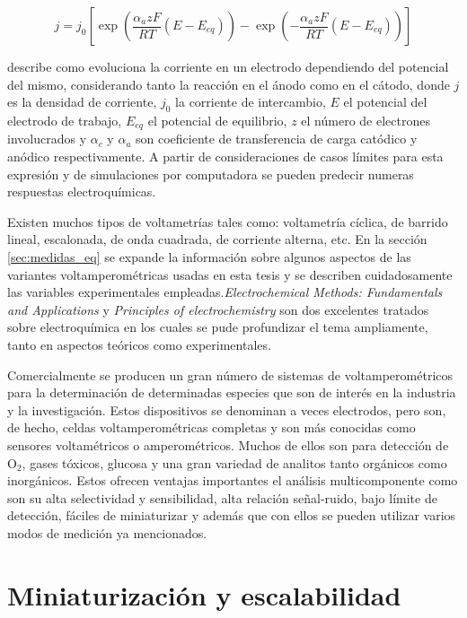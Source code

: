 			\begin{equation}
			j=j_0\left[\exp\left(\frac{\alpha_azF}{RT}(E-E_{eq})\right)-\exp\left(-\frac{\alpha_azF}{RT}(E-E_{eq})\right)\right]
			\label{eq:butler}
			\end{equation}


		\noindent describe como evoluciona la corriente en un electrodo dependiendo del potencial del mismo, considerando tanto la reacción en el ánodo como en el cátodo, donde $j$ es la densidad de corriente, $j_0$ la corriente de intercambio, $E$ el potencial del electrodo de trabajo, $E_{eq}$ el potencial de equilibrio, $z$ el número de electrones involucrados y $\alpha_c$ y $\alpha_a$ son coeficiente de transferencia de carga catódico y anódico respectivamente. A partir de consideraciones de casos límites para esta expresión y de simulaciones por computadora se pueden predecir numeras respuestas electroquímicas.

		Existen muchos tipos de voltametrías tales como: voltametría cíclica, de barrido lineal, escalonada, de onda cuadrada, de corriente alterna, etc. En la sección \ref{sec:medidas_eq} se expande la información sobre algunos aspectos de las variantes voltamperométricas usadas en esta tesis y se describen cuidadosamente las variables experimentales empleadas.\textit{Electrochemical Methods: Fundamentals and Applications}\cite{Wi2000} y  \textit{Principles of electrochemistry}\cite{koryta1993} son dos excelentes tratados sobre electroquímica en los cuales se pude profundizar el tema ampliamente, tanto en aspectos teóricos como experimentales. 

		Comercialmente se producen un gran número de sistemas de voltamperométricos para la determinación de determinadas especies que son de interés en la industria y la investigación. Estos dispositivos se denominan a veces electrodos, pero son, de hecho, celdas voltamperométricas completas y son más conocidas como sensores voltamétricos o amperométricos. Muchos de ellos son para detección de O$_2$, gases tóxicos, glucosa y una gran variedad de analitos tanto orgánicos como inorgánicos. Estos ofrecen ventajas importantes el análisis multicomponente como son su alta selectividad y sensibilidad, alta relación señal-ruido, bajo límite de detección, fáciles de miniaturizar y además que con ellos se pueden utilizar varios modos de medición ya mencionados.\cite{bakker2006,stradiotto2003,harris2013,Ciosek2007,Kojima2003}
			
\section{Miniaturización y escalabilidad}\label{sec:microfabricacion}\label{sec:intro_fotolito}
		
